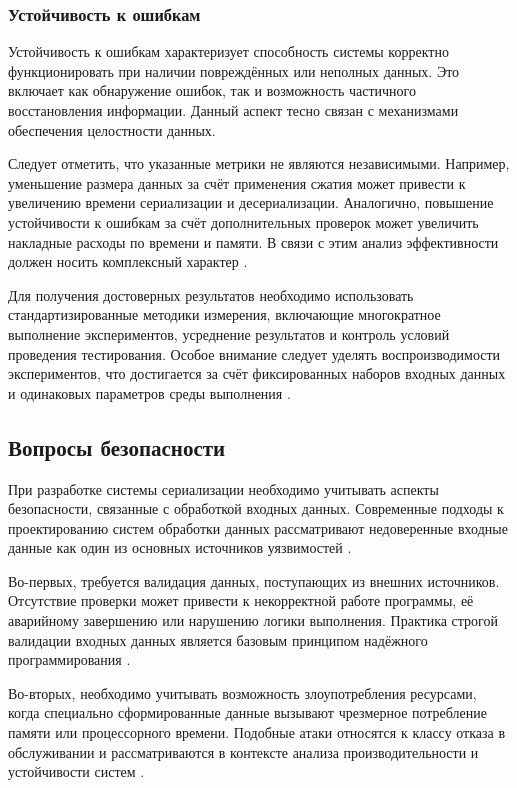 \documentclass[coursework]{SCWorks}
\begin{document}
\subsubsection{Устойчивость к ошибкам}
Устойчивость к ошибкам характеризует способность системы корректно функционировать при наличии повреждённых или неполных данных. Это включает как обнаружение ошибок, так и возможность частичного восстановления информации. Данный аспект тесно связан с механизмами обеспечения целостности данных.

Следует отметить, что указанные метрики не являются независимыми. Например, уменьшение размера данных за счёт применения сжатия может привести к увеличению времени сериализации и десериализации. Аналогично, повышение устойчивости к ошибкам за счёт дополнительных проверок может увеличить накладные расходы по времени и памяти. В связи с этим анализ эффективности должен носить комплексный характер \cite{jain1991art, georges2007statistically}.

Для получения достоверных результатов необходимо использовать стандартизированные методики измерения, включающие многократное выполнение экспериментов, усреднение результатов и контроль условий проведения тестирования. Особое внимание следует уделять воспроизводимости экспериментов, что достигается за счёт фиксированных наборов входных данных и одинаковых параметров среды выполнения \cite{georges2007statistically}.

\subsection{Вопросы безопасности}

При разработке системы сериализации необходимо учитывать аспекты безопасности, связанные с обработкой входных данных. Современные подходы к проектированию систем обработки данных рассматривают недоверенные входные данные как один из основных источников уязвимостей \cite{kleppmann2017designing, martin2022clean}.

Во-первых, требуется валидация данных, поступающих из внешних источников. Отсутствие проверки может привести к некорректной работе программы, её аварийному завершению или нарушению логики выполнения. Практика строгой валидации входных данных является базовым принципом надёжного программирования \cite{martin2022clean}.

Во-вторых, необходимо учитывать возможность злоупотребления ресурсами, когда специально сформированные данные вызывают чрезмерное потребление памяти или процессорного времени. Подобные атаки относятся к классу отказа в обслуживании и рассматриваются в контексте анализа производительности и устойчивости систем \cite{gregg2013systems}.
\end{document}
